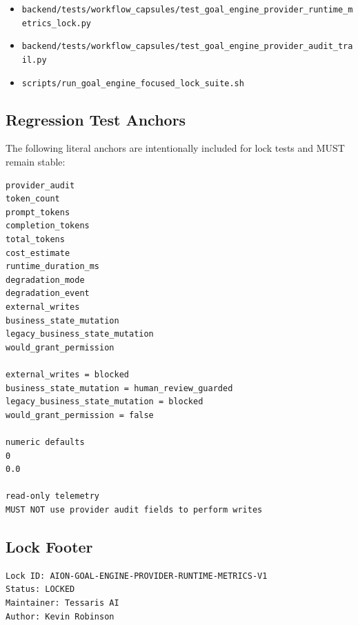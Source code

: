 \begin{itemize}
  \item \texttt{backend/tests/workflow\_capsules/test\_goal\_engine\_provider\_runtime\_metrics\_lock.py}
  \item \texttt{backend/tests/workflow\_capsules/test\_goal\_engine\_provider\_audit\_trail.py}
  \item \texttt{scripts/run\_goal\_engine\_focused\_lock\_suite.sh}
\end{itemize}


\subsection{Regression Test Anchors}

The following literal anchors are intentionally included for lock tests and
MUST remain stable:

\begin{verbatim}
provider_audit
token_count
prompt_tokens
completion_tokens
total_tokens
cost_estimate
runtime_duration_ms
degradation_mode
degradation_event
external_writes
business_state_mutation
legacy_business_state_mutation
would_grant_permission

external_writes = blocked
business_state_mutation = human_review_guarded
legacy_business_state_mutation = blocked
would_grant_permission = false

numeric defaults
0
0.0

read-only telemetry
MUST NOT use provider audit fields to perform writes
\end{verbatim}


\subsection{Lock Footer}

\begin{verbatim}
Lock ID: AION-GOAL-ENGINE-PROVIDER-RUNTIME-METRICS-V1
Status: LOCKED
Maintainer: Tessaris AI
Author: Kevin Robinson
\end{verbatim}
